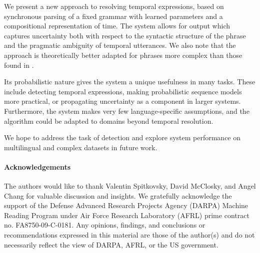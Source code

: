We present a new approach to resolving temporal expressions,
	based on synchronous parsing of a fixed grammar with learned parameters
	and a compositional representation of time.
The system allows for output which captures uncertainty both with respect to 
	the syntactic structure of the phrase and the pragmatic ambiguity of 
	temporal utterances.
We also note that the approach is theoretically better adapted for
	phrases more complex than those found in \tempeval.

Its probabilistic nature gives the system a unique usefulness
	in many tasks.
These include detecting temporal expressions, making probabilistic
	sequence models more practical, or propagating uncertainty as a
	component in larger systems.
Furthermore, the system makes very few language-specific assumptions,
	and the algorithm could be adapted to domains beyond temporal resolution.

We hope to address the task of detection and explore system performance
	on multilingual and complex datasets in future work.

{\small
\paragraph{Acknowledgements}
The authors would like to thank Valentin Spitkovsky, David McClosky,
	and Angel Chang for valuable discussion and insights.
We gratefully acknowledge the support of the Defense Advanced 
	Research Projects Agency (DARPA) Machine Reading Program under Air 
	Force Research Laboratory (AFRL) prime contract no. FA8750-09-C-0181. 
Any opinions, findings, and conclusions or recommendations expressed 
	in this material are those of the author(s) and do not necessarily 
	reflect the view of DARPA, AFRL, or the US government.
}
